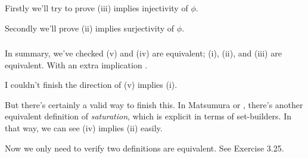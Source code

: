 Firstly we'll try to prove (iii) implies injectivity of $\phi$.

Secondly we'll prove (ii) implies surjectivity of $\phi$.

\subsubsection{}

In summary, we've checked (v) and (iv) are equivalent; (i), (ii), and (iii) are equivalent. With an extra implication . 

I couldn't finish the direction of (v) implies (i). \todo{!}

But there's certainly a valid way to finish this. In Matsumura \cite{matsumura1989commutative} or \cite{altman}, there's another equivalent definition of \textit{saturation}, which is explicit in terms of set-builders. In that way, we can see (iv) implies (ii) easily. 

Now we only need to verify two definitions are equivalent. See \cite{altman} Exercise 3.25.
